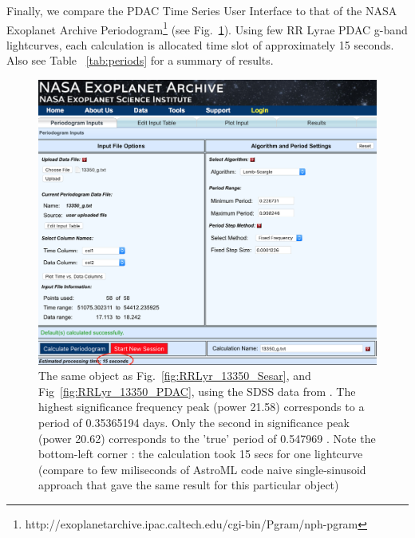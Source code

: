 \documentclass[fleqn,usenatbib]{mnras} %
\begin{document}
Finally, we compare the PDAC Time Series User Interface to that of the  NASA Exoplanet Archive Periodogram\footnote{http://exoplanetarchive.ipac.caltech.edu/cgi-bin/Pgram/nph-pgram} (see Fig.~\ref{fig:exoplanet_archive}). Using few RR Lyrae PDAC g-band  lightcurves, each calculation is allocated time slot of approximately 15 seconds. Also see Table ~\ref{tab:periods} for a summary of results. 

\begin{figure}
\includegraphics[width=\textwidth]{figs/Exoplanet_archive_periodogram}
\caption{ The same object as Fig.~\ref{fig:RRLyr_13350_Sesar}, and Fig~\ref{fig:RRLyr_13350_PDAC},  using  the SDSS data from \citep{sesar2010}.  The highest significance frequency peak (power 21.58) corresponds to  a period of 0.35365194 days. Only the second in significance peak (power 20.62) corresponds to the 'true' period of 0.547969 \citep{sesar2010}. Note the bottom-left corner : the calculation took 15 secs for one lightcurve (compare to few miliseconds of AstroML code naive single-sinusoid approach that gave the same result for this particular object) }
\label{fig:exoplanet_archive}
\end{figure}


\end{document}
